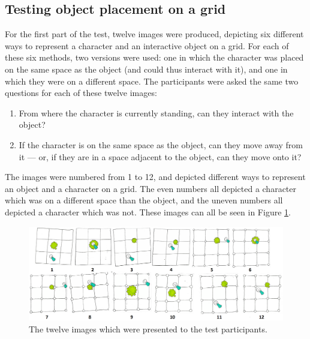 \subsection{Testing object placement on a grid}
For the first part of the test, twelve images were produced, depicting six different ways to represent a character and an interactive object on a grid. For each of these six methods, two versions were used: one in which the character was placed on the same space as the object (and could thus interact with it), and one in which they were on a different space. The participants were asked the same two questions for each of these twelve images:

\begin{enumerate}
    \item From where the character is currently standing, can they interact with the object?
    \item If the character is on the same space as the object, can they move away from it --- or, if they are in a space adjacent to the object, can they move onto it?
\end{enumerate}

The images were numbered from 1 to 12, and depicted different ways to represent an object and a character on a grid. The even numbers all depicted a character which was on a different space than the object, and the uneven numbers all depicted a character which was not. These images can all be seen in Figure \ref{fig:papergrid}.

\begin{figure}[h!]
	\centering
	\includegraphics[width=\textwidth]{figures/paper_0.png}
	\caption{The twelve images which were presented to the test participants. \label{fig:papergrid}}
\end{figure}

